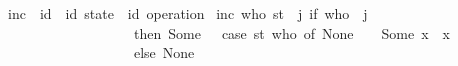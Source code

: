 \begin{isabellebody}
\isamarkupfalse%
\ inc\ {\isacharcolon}{\isacharcolon}\ {\isachardoublequoteopen}{\isacharprime}id\ {\isasymRightarrow}\ {\isacharparenleft}{\isacharprime}id\ state{\isacharparenright}\ {\isasymRightarrow}\ {\isacharparenleft}{\isacharprime}id\ operation{\isacharparenright}{\isachardoublequoteclose}\ \isanewline
{\isachardoublequoteopen}inc\ who\ st\ {\isacharequal}\ {\isacharparenleft}{\isasymlambda}j{\isachardot}\ if\ who\ {\isacharequal}\ j\isanewline
\ \ \ \ \ \ \ \ \ \ \ \ \ \ \ \ \ \ \ then\ Some\ {\isacharparenleft}{}\ {\isacharplus}\ {\isacharparenleft}case\ {\isacharparenleft}st\ who{\isacharparenright}\ of\ None\ {\isasymRightarrow}\ {}\ {\isacharbar}\ Some\ {\isacharparenleft}x{\isacharparenright}\ {\isasymRightarrow}\ x{\isacharparenright}{\isacharparenright}\isanewline
\ \ \ \ \ \ \ \ \ \ \ \ \ \ \ \ \ \ \ else\ None{\isacharparenright}{\isachardoublequoteclose}\isanewline
\end{isabellebody}
